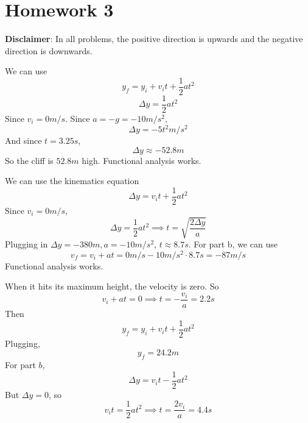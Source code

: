 \documentclass[11pt]{scrartcl}
\begin{document}
\section{Homework 3}
\textbf{Disclaimer}: In all problems, the positive direction is upwards
and the negative direction is downwards.
\begin{example}
  [Problem 33]
\end{example}
\begin{soln}
  We can use
  $$y_f=y_i+v_it+\frac{1}{2}at^2$$
  $$\Delta y=\frac{1}{2}at^2$$
  Since $v_i=0 m/s$. Since $a=-g=-10 m/s^2$,
  $$\Delta y=-5t^2 m/s^2$$
  And since $t=3.25s$,
  $$\Delta y\approx -52.8m$$
  So the cliff is $52.8m$ high. Functional analysis works.
\end{soln}
\begin{example}
  [Problem 35]
\end{example}
\begin{soln}
  We can use the kinematics equation
  $$\Delta y=v_it+\frac{1}{2}at^2$$
  Since $v_i=0m/s$,
  $$\Delta y=\frac{1}{2}at^2\implies t=\sqrt{\frac{2\Delta y}{a}}$$
  Plugging in $\Delta y=-380m, a=-10m/s^2$, $t\approx 8.7s$.
  For part b, we can use
  $$v_f=v_i+at=0m/s-10m/s^2\cdot 8.7s=-87m/s$$
  Functional analysis works.
\end{soln}
\begin{example}
  [Problem 36]
\end{example}
\begin{soln}
  When it hits its maximum height, the velocity is zero. So
  $$v_i+at=0\implies t=-\frac{v_i}{a}=2.2s$$
  Then
  $$y_f=y_i+v_it+\frac{1}{2}at^2$$
  Plugging,
  $$y_f=24.2m$$
  For part $b$,
  $$\Delta y=v_it-\frac{1}{2}at^2$$
  But $\Delta y=0$, so
  $$v_it=\frac{1}{2}at^2\implies t=\frac{2v_i}{a}=4.4s$$
\end{soln}
\begin{example}
  [Problem 38]
\end{example}
\end{document}
